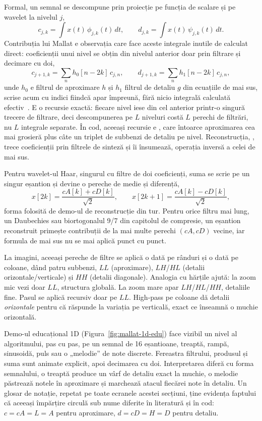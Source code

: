 Formal, un semnal se descompune prin proiecție pe funcția de scalare și pe
wavelet la nivelul $j$,
\[
c_{j,k} = \int x(t)\,\phi_{j,k}(t)\,dt, \qquad d_{j,k} = \int x(t)\,\psi_{j,k}(t)\,dt.
\]
Contribuția lui Mallat e observația care face aceste integrale inutile de
calculat direct: coeficienții unui nivel se obțin din nivelul anterior doar
prin filtrare și decimare cu doi,
\[
c_{j+1,k} = \sum_n h_0[n-2k]\,c_{j,n}, \qquad
d_{j+1,k} = \sum_n h_1[n-2k]\,c_{j,n},
\]
unde $h_0$ e filtrul de aproximare $h$ și $h_1$ filtrul de detaliu $g$ din
ecuațiile de mai sus, scrise acum cu indici fiindcă apar împreună,
fără nicio integrală calculată efectiv~\cite{mallat1989,mallat2008}. E o
recursie exactă: fiecare nivel iese din cel anterior printr-o singură
trecere de filtrare, deci descompunerea pe $L$ niveluri costă $L$ perechi de
filtrări, nu $L$ integrale separate. În cod, aceeași recursie e
, care întoarce
aproximarea cea mai grosieră plus câte un triplet de subbenzi de detaliu pe
nivel. Reconstrucția, , trece coeficienții prin filtrele
de sinteză și îi însumează, operația inversă a celei de mai sus.

Pentru wavelet-ul Haar, singurul cu filtre de doi coeficienți, suma se scrie
pe un singur eșantion și devine o pereche de medie și diferență,
\[
x[2k] = \frac{cA[k]+cD[k]}{\sqrt2}, \qquad x[2k+1] = \frac{cA[k]-cD[k]}{\sqrt2},
\]
forma folosită de demo-ul de reconstrucție din tur. Pentru orice filtru mai
lung, un Daubechies sau biortogonalul 9/7 din capitolul de compresie, un
eșantion reconstruit primește contribuții de la mai multe perechi
$(cA,cD)$ vecine, iar formula de mai sus nu se mai aplică punct cu punct.

La imagini, aceeași pereche de filtre se aplică o dată pe rânduri și o dată
pe coloane, dând patru subbenzi, $LL$ (aproximare), $LH$/$HL$ (detalii
orizontale/verticale) și $HH$ (detalii diagonale). Analogia cu hărțile ajută:
la zoom mic vezi doar $LL$, structura globală. La zoom mare apar
$LH$/$HL$/$HH$, detaliile fine. Pasul se aplică recursiv doar pe $LL$.
High-pass pe coloane dă detalii \emph{orizontale} pentru că răspunde la
variația pe verticală, exact ce înseamnă o muchie orizontală.

Demo-ul educațional 1D (Figura~\ref{fig:mallat-1d-edu}) face vizibil un
nivel al algoritmului, pas cu pas, pe un semnal de 16 eșantioane, treaptă,
rampă, sinusoidă, puls sau o „melodie” de note discrete. Fereastra
filtrului, produsul și suma sunt animate explicit, apoi decimarea cu doi.
Interpretarea diferă cu forma semnalului, o treaptă produce un vârf de
detaliu exact la muchie, o melodie păstrează notele în aproximare și
marchează atacul fiecărei note în detaliu. Un glosar de notație, repetat pe
toate ecranele acestei secțiuni, ține evidența faptului că aceeași împărțire
circulă sub nume diferite în literatură și în cod: $c = cA = L = A$ pentru
aproximare, $d = cD = H = D$ pentru detaliu.

